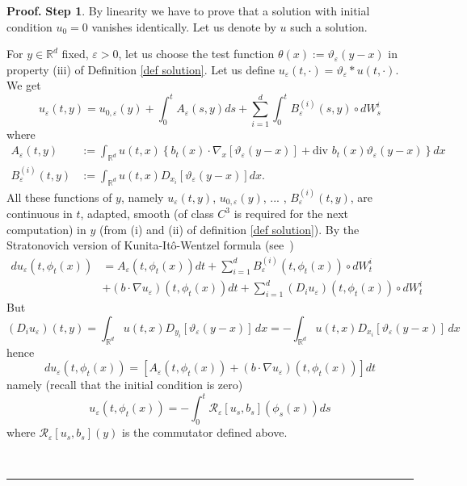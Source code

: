 \documentclass[a4paper,10pt]{article}
\newenvironment{proof}[1][Proof]{\textbf{#1.} }{\ \rule{0.5em}{0.5em}}
\begin{document}
\begin{proof}
\textbf{Step 1}. By linearity we have to prove that a solution with initial
condition $u_{0}=0$ vanishes identically. Let us denote by $u$ such a solution.

For $y\in{\mathbb{R}}^{d}$ fixed, ${\varepsilon}>0$, let us choose
the test function $\theta(x):=\vartheta_{{\varepsilon}}\left(
y-x\right)  $ in property (iii) of Definition \ref{def solution}.
Let us define $u_{{\varepsilon}}(t,\cdot) = \vartheta_{{\varepsilon
}} * u(t,\cdot)$.
 We get
\[
u_{{\varepsilon}}(t,y)=u_{0,{\varepsilon}}(y)+\int_{0}^{t}A_{\varepsilon
}\left(  s,y\right)  ds+\sum_{i=1}^{d}\int_{0}^{t}B_{\varepsilon}^{\left(
i\right)  }\left(  s,y\right)  \circ dW_{s}^{i}%
\]
where
\begin{align*}
A_{\varepsilon}\left(  t,y\right)   &  :=\int_{{}{\mathbb{R}}^{d}%
}u(t,x)\left\{  b_{t}(x)\cdot\nabla_{x}[\vartheta_{{\varepsilon}%
}(y-x)]+{\mathrm{div}\, \,}b_{t}(x)\vartheta_{\varepsilon}(y-x)\right\}  dx\\
B_{\varepsilon}^{\left(  i\right)  }\left(  t,y\right)   &  :=\int
_{{}{\mathbb{R}}^{d}}u(t,x)D_{x_{i}}[\vartheta_{{\varepsilon}}\left(
y-x\right)  ]dx.
\end{align*}
All these functions of $y$, namely $u_{{\varepsilon}}(t,y)$,
$u_{0,{\varepsilon}}(y)$, ... , $B_{\varepsilon}^{\left(  i\right)  }\left(
t,y\right)  $, are continuous in $t$, adapted, smooth (of class $C^{3}$ is
required for the next computation) in $y$ (from (i) and (ii) of definition
\ref{def solution}). By the  Stratonovich version of Kunita-It\^{o}-Wentzel formula
(see~\cite[Th. 8.3 page 188]{K})
\begin{align*}
du_{{\varepsilon}}(t,{\phi}_{t}(x))  &  =A_{\varepsilon}\left(  t,{\phi}%
_{t}(x)\right)  dt+\sum_{i=1}^{d}B_{\varepsilon}^{\left(  i\right)  }\left(
t,{\phi}_{t}(x)\right)  \circ dW_{t}^{i}\\
&  +\left(  b\cdot\nabla u_{{\varepsilon}}\right)  (t,{\phi}_{t}%
(x))dt+\sum_{i=1}^{d}\left(  D_{i}u_{{\varepsilon}}\right)  (t,{\phi}%
_{t}(x))\circ dW_{t}^{i}%
\end{align*}
But
\[
\left(  D_{i}u_{{\varepsilon}}\right)  (t,{y})={\int_{{\mathbb{R}}^{d}}%
}u(t,x)D_{y_{i}}[\vartheta_{{\varepsilon}}\left(  y-x\right)  ]\,dx=-{\int
_{{\mathbb{R}}^{d}}}u(t,x)D_{x_{i}}[\vartheta_{{\varepsilon}}\left(
y-x\right)  ]\,dx
\]
hence
\[
du_{{\varepsilon}}(t,{\phi}_{t}(x))=\left[  A_{\varepsilon}\left(  t,{\phi
}_{t}(x)\right)  +\left(  b\cdot\nabla u_{{\varepsilon}}\right)  (t,{\phi}%
_{t}(x))\right]  dt
\]
namely (recall that the initial condition is zero)
\[
u_{{\varepsilon}}(t,{\phi}_{t}(x))=-
 \int_{0}^{t}\mathcal{R}_{\varepsilon }\left[
u_{s},b_{s}\right] \left(  {\phi}_{s}(x)\right)  ds
\]
where $\mathcal{R}_{\varepsilon}\left[  u_{s},b_{s}\right]  \left(
{y}\right)  $ is the commutator defined above.


\end{proof}
\end{document}
